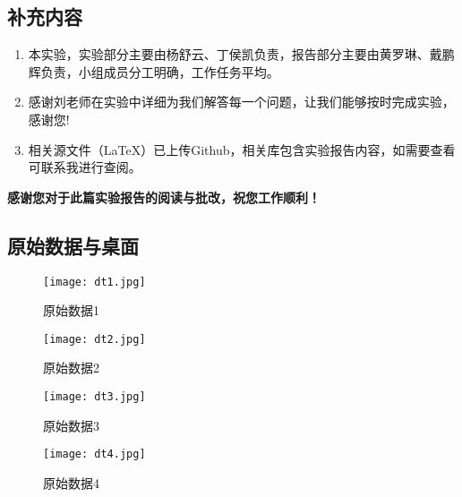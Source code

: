 
\clearpage
{}

\subsection{补充内容}

\begin{enumerate}
	\item 本实验，实验部分主要由杨舒云、丁侯凯负责，报告部分主要由黄罗琳、戴鹏辉负责，小组成员分工明确，工作任务平均。
	
	\item 感谢刘老师在实验中详细为我们解答每一个问题，让我们能够按时完成实验，感谢您!
	\item 相关源文件（\LaTeX）已上传Github，相关库包含实验报告内容，如需要查看可联系我进行查阅。
\end{enumerate}
\quad \large \textbf{感谢您对于此篇实验报告的阅读与批改，祝您工作顺利！}

\subsection{原始数据与桌面}
 \begin{figure}[H]
    \centering
    \begin{minipage}[b]{0.45\linewidth}
        \centering
        \texttt{[image: dt1.jpg]}
        \caption{原始数据1}

    \end{minipage}
    \hfill
    \begin{minipage}[b]{0.45\linewidth}
        \centering
        \texttt{[image: dt2.jpg]}
        \caption{原始数据2}
    
    \end{minipage}

\end{figure}
 \begin{figure}[H]
    \centering
    \begin{minipage}[b]{0.45\linewidth}
        \centering
        \texttt{[image: dt3.jpg]}
        \caption{原始数据3}

    \end{minipage}
    \hfill
    \begin{minipage}[b]{0.45\linewidth}
        \centering
        \texttt{[image: dt4.jpg]}
        \caption{原始数据4}

    \end{minipage}


\end{figure}
